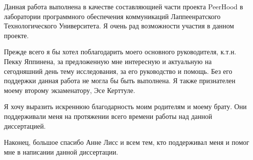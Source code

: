 %
%
Данная работа выполнена в качестве составляющией части проекта PeerHood в лаборатории программного обеспечения коммуникаций Лаппеенратского Технологического Университета. 
%
Я очень рад возможности участия в данном проекте.

%
Прежде всего я бы хотел поблагодарить моего основного руководителя, к.т.н. Пекку Яппинена, за предложенную мне интересную и актуальную на сегодняшний день тему исследования, за его руководство и помощь.
%
Без его поддержки данная работа не могла бы быть выполнена.
%
Я также признателен моему второму экзаменатору, Эсе Керттуле. 

%
Я хочу выразить искреннюю благодарность моим родителям и моему брату. Они поддерживали меня на протяжении всего времени работы над данной диссертацией.

%
Наконец, большое спасибо Анне Лисс и всем тем, кто поддерживал меня и помог мне в написании данной диссертации.